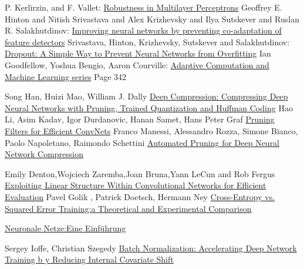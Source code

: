 \documentclass[12pt,a4paper]{scrartcl}
\numberwithin{equation}{section}
\begin{document}
\begin{thebibliography}{lem00}
	P. Kerlirzin, and F. Vallet: \href{ https://www.mitpressjournals.org/doi/abs/10.1162/neco.1993.5.3.473?journalCode=neco} {Robustness in Multilayer Perceptrons}
 	Geoffrey E. Hinton and Nitish Srivastava and Alex Krizhevsky and Ilya Sutskever and Ruslan R. Salakhutdinov: \href{https://arxiv.org/abs/1207.0580}{Improving neural networks by preventing co-adaptation of feature detectors}
 	Srivastava, Hinton, Krizhevsky, Sutskever and Salakhutdinov: \href{http://jmlr.org/papers/volume15/srivastava14a.old/srivastava14a.pdf}{Dropout: A Simple Way to Prevent Neural Networks from Overfitting}
Ian Goodfellow, Yoshua Bengio, Aaron Courville:
\href{https://www.amazon.com/Deep-Learning-Adaptive-Computation-Machine/dp/0262035618/ref=as_li_ss_tl?ieTF8&qid=1548018253&sr=8-3&keywords=deep+learning&linkCode=sl1&tag=inspiredalgor-20&linkId=49b3b1cce7e04bb3c9b99f2d878bf805&language=en_US}{Adaptive Computation and Machine Learning series} Page 342
 
	 Song Han, Huizi Mao, William J. Dally \href{https://arxiv.org/abs/1510.00149}{Deep Compression: Compressing Deep Neural Networks with Pruning, Trained Quantization and Huffman Coding}
 	Hao Li, Asim Kadav, Igor Durdanovic, Hanan Samet, Hans Peter Graf
 	\href{https://arxiv.org/abs/1608.08710}{Pruning Filters for Efficient ConvNets}
      Franco Manessi, Alessandro Rozza, Simone Bianco, Paolo Napoletano, Raimondo Schettini \href{https://arxiv.org/abs/1712.01721}{Automated Pruning for Deep Neural Network Compression}
      
   		Emily Denton,Wojciech Zaremba,Joan Bruna,Yann LeCun and	Rob Fergus
   		\href{https://arxiv.org/pdf/1404.0736.pdf}{Exploiting Linear Structure Within Convolutional
   			Networks for Efficient Evaluation}
 	 Pavel Golik , Patrick Doetsch, Hermann Ney
 	\href{http://books.jackon.me/Cross-Entropy-vs-Squared-Error-Training-a-Theoretical-and-Experimental-Comparison.pdf}{Cross-Entropy vs. Squared Error Training:a Theoretical and Experimental Comparison}
 	
 	\href{http://www.neuronalesnetz.de/aktivitaet.html}{Neuronale Netze:Eine Einführung}
 	
	Sergey Ioffe, Christian Szegedy
 	\href{https://arxiv.org/pdf/1502.03167.pdf}{Batch Normalization: Accelerating Deep Network Training b
 		y
 		Reducing Internal Covariate Shift}


\end{thebibliography}
\end{document}
